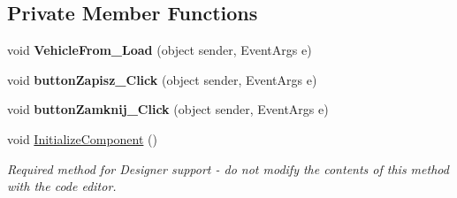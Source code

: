 \subsection*{Private Member Functions}
\begin{DoxyCompactItemize}
\item 
\mbox{\label{class_statystyki___o_s_p_1_1_vehicle_from_a6a05d44cb2a9581dbad3812ee8074c7d}} 
void {\bfseries Vehicle\+From\+\_\+\+Load} (object sender, Event\+Args e)
\item 
\mbox{\label{class_statystyki___o_s_p_1_1_vehicle_from_a2c69a411bdbf56576c8bf3a589f37279}} 
void {\bfseries button\+Zapisz\+\_\+\+Click} (object sender, Event\+Args e)
\item 
\mbox{\label{class_statystyki___o_s_p_1_1_vehicle_from_a9d4110cb62c910585ffd0e89a176d451}} 
void {\bfseries button\+Zamknij\+\_\+\+Click} (object sender, Event\+Args e)
\item 
void \mbox{\hyperlink{class_statystyki___o_s_p_1_1_vehicle_from_a2a4c3e922575fbf0e9010c2445d6f114}{Initialize\+Component}} ()
\begin{DoxyCompactList}\small\item\em Required method for Designer support -\/ do not modify the contents of this method with the code editor. \end{DoxyCompactList}\end{DoxyCompactItemize}
